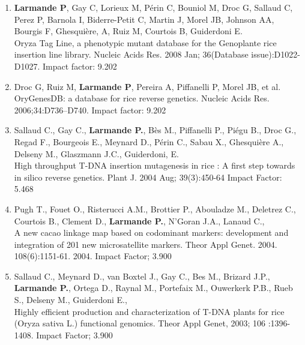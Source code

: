 \begin{enumerate}
\item	\textbf{Larmande P}, Gay C, Lorieux M, Périn C, Bouniol M, Droc G, Sallaud C, Perez P, Barnola I, Biderre-Petit C, Martin J, Morel JB, Johnson AA, Bourgis F, Ghesquière, A, Ruiz M, Courtois B, Guiderdoni E.\\ Oryza Tag Line, a phenotypic mutant database for the Genoplante rice insertion line library. Nucleic Acids Res. 2008 Jan; 36(Database issue):D1022-D1027. Impact factor: 9.202
\item	Droc G, Ruiz M, \textbf{Larmande P}, Pereira A, Piffanelli P, Morel JB, et al.\\ OryGenesDB: a database for rice reverse genetics. Nucleic Acids Res. 2006;34:D736–D740. Impact factor: 9.202
\item Sallaud C., Gay C., \textbf{Larmande P.}, Bès M., Piffanelli P., Piégu B., Droc G., Regad F., Bourgeois E., Meynard D., Périn C., Sabau X., Ghesquière A., Delseny M., Glaszmann J.C., Guiderdoni, E.\\ High throughput T-DNA insertion mutagenesis in rice : A first step towards in silico reverse genetics. Plant J. 2004 Aug; 39(3):450-64  Impact Factor: 5.468 
\item	Pugh T., Fouet O., Risterucci A.M., Brottier P., Abouladze M., Deletrez C., Courtois B., Clement D., \textbf{Larmande P.}, N'Goran J.A., Lanaud C.,\\ A new cacao linkage map based on codominant markers: development and integration of 201 new microsatellite markers. Theor Appl Genet. 2004. 108(6):1151-61. 2004. Impact Factor; 3.900
\item	Sallaud C., Meynard D., van Boxtel J., Gay C., Bes M., Brizard J.P., \textbf{Larmande P.}, Ortega D., Raynal M., Portefaix M., Ouwerkerk P.B., Rueb S., Delseny M., Guiderdoni E.,\\  Highly efficient production and characterization of T-DNA plants for rice (Oryza sativa L.) functional genomics. Theor Appl Genet, 2003; 106 :1396-1408. Impact Factor; 3.900
\end{enumerate}

